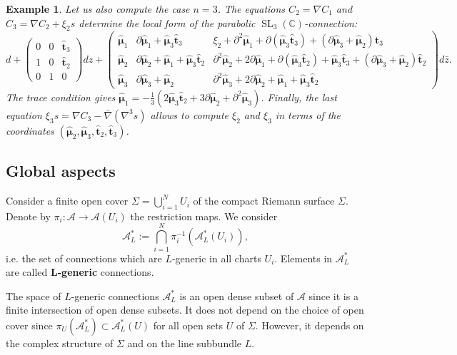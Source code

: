 \documentclass[11pt]{amsart}
\newtheorem{example}[thm]{Example}
\numberwithin{thm}{section} %
\numberwithin{equation}{section} %
\numberwithin{figure}{section} %
\newcommand*{\C}{\mathbb{C}}
\DeclareMathOperator{\SL}{SL}
\begin{document}
\begin{example}
Let us also compute the case $n=3$. The equations $C_2=\nabla C_1$ and $C_3=\nabla C_2+\xi_2 s$ determine the local form of the parabolic $\SL_3(\C)$-connection:
$$ d + \begin{pmatrix}0&0&\bm\hat{t}_3\\1&0&\bm\hat{t}_2\\0&1&0\end{pmatrix}dz
+\begin{pmatrix}\bm\hat{\mu}_1 & \partial\bm\hat{\mu}_1+\bm\hat{\mu}_3\bm\hat{t}_3 & \xi_2+\partial^2\bm\hat{\mu}_1+\partial(\bm\hat{\mu}_3\bm\hat{t}_3)+(\partial\bm\hat{\mu}_3+\bm\hat{\mu}_2)\bm\hat{t}_3\\
\bm\hat{\mu}_2 & \partial \bm\hat{\mu}_2+\bm\hat{\mu}_1+\bm\hat{\mu}_3\bm\hat{t}_2 & \partial^2\bm\hat{\mu}_2+2\partial\bm\hat{\mu}_1+\partial(\bm\hat{\mu}_3\bm\hat{t}_2)+\bm\hat{\mu}_3\bm\hat{t}_3+(\partial\bm\hat{\mu}_3+\bm\hat{\mu}_2)\bm\hat{t}_2\\
\bm\hat{\mu}_3 & \partial\bm\hat{\mu}_3+\bm\hat{\mu}_2&\partial^2\bm\hat{\mu}_3+2\partial\bm\hat{\mu}_2+\bm\hat{\mu}_1+\bm\hat{\mu}_3\bm\hat{t}_2\end{pmatrix}d\bar{z}.$$
The trace condition gives $\bm\hat{\mu}_1=-\tfrac{1}{3}(2\bm\hat{\mu}_3\bm\hat{t}_2+3\partial\bm\hat{\mu}_2+\partial^2\bm\hat{\mu}_3)$. Finally, the last equation $\xi_3s=\nabla C_3-\bar\nabla(\nabla^3s)$ allows to compute $\xi_2$ and $\xi_3$ in terms of the coordinates $(\bm\hat{\mu}_2,\bm\hat{\mu}_3,\bm\hat{t}_2,\bm\hat{t}_3)$.
\end{example}


\subsection{Global aspects}

Consider a finite open cover $\Sigma=\bigcup_{i=1}^N U_i$ of the compact Riemann surface $\Sigma$. Denote by $\pi_i:\mathcal{A}\to\mathcal{A}(U_i)$ the restriction maps. We consider
$$\mathcal{A}^*_L:= \bigcap_{i=1}^N \pi_i^{-1}(\mathcal{A}^*_L(U_i)),$$
i.e. the set of connections which are $L$-generic in all charts $U_i$. 
Elements in $\mathcal{A}^*_L$ are called $\mathbf{L}$\textbf{-generic} connections. 

The space of $L$-generic connections $\mathcal{A}^*_L$ is an open dense subset of $\mathcal{A}$ since it is a finite intersection of open dense subsets. It does not depend on the choice of open cover since $\pi_U(\mathcal{A}^*_L)\subset \mathcal{A}^*_L(U)$ for all open sets $U$ of $\Sigma$. However, it depends on the complex structure of $\Sigma$ and on the line subbundle $L$.
\end{document}

